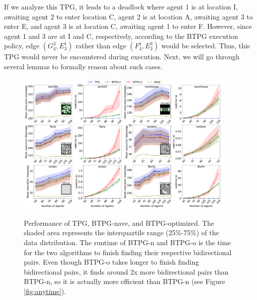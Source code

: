 \documentclass[letterpaper]{article}
\theoremstyle{definition}
\begin{document}
If we analyze this TPG, it leads to a deadlock where agent 1 is at location I, awaiting agent 2 to enter location C, agent 2 is at location A, awaiting agent 3 to enter E, and agent 3 is at location C, awaiting agent 1 to enter F. However, since agent 1 and 3 are at I and C, respectively, according to the BTPG execution policy, edge $(G_4^3,E_3^1)$ rather than edge $(F_4^1,E_3^3)$ would be selected.
Thus, this TPG would never be encountered during execution. Next, we will go through several lemmas to formally reason about such cases.

\begin{figure}[th!]
\centering
\includegraphics[width=0.95\textwidth]{Figs/results.pdf}
\label{random}
\caption{Performance of TPG, BTPG-nave, and BTPG-optimized. The shaded area represents the interquartile range (25\%-75\%) of the data distribution. The runtime of BTPG-n and BTPG-o is the time for the two algorithms to finish finding their respective bidirectional pairs. Even though BTPG-o takes longer to finish finding bidirectional pairs, it finds around 2x more bidirectional pairs than BTPG-n, so it is actually more efficient than BTPG-n (see Figure \ref{fig:anytime}). }
\label{fig:comparison}
\end{figure}
\end{document}
